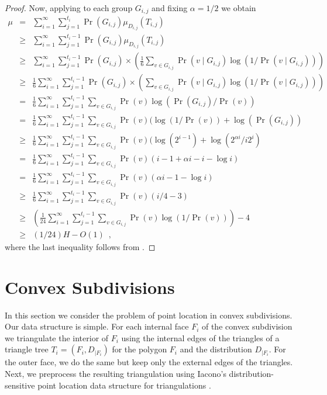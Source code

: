 \documentclass[charterfonts,lotsofwhite]{patmorin}
\begin{document}
\begin{proof}
Now, applying  to each group $G_{i,j}$ and fixing
$\alpha = 1/2$ we obtain
\begin{eqnarray*}
\mu & = & \sum_{i=1}^{\infty}\sum_{j=1}^{t_i}
	\Pr(G_{i,j})\mu_{D_{i,j}}(T_{i,j}) \\
& \ge & \sum_{i=1}^{\infty}\sum_{j=1}^{t_i-1}
	\Pr(G_{i,j})\mu_{D_{i,j}}(T_{i,j}) \\
& \ge & \sum_{i=1}^{\infty}\sum_{j=1}^{t_i-1}\Pr(G_{i,j})\times
	\left(\frac{1}{6}
	\sum_{v\in G_{i,j}}\Pr(v\mid G_{i,j})\log(1/\Pr(v\mid G_{i,j}))
	\right) \\
& \ge & \frac{1}{6}\sum_{i=1}^{\infty}\sum_{j=1}^{t_i-1}\Pr(G_{i,j})\times
	\left(
	\sum_{v\in G_{i,j}}\Pr(v\mid G_{i,j})\log(1/\Pr(v\mid G_{i,j}))
	\right) \\
& = & \frac{1}{6}\sum_{i=1}^{\infty}\sum_{j=1}^{t_i-1}
	\sum_{v\in G_{i,j}}\Pr(v)\log(\Pr(G_{i,j})/\Pr(v)) \\
& = & \frac{1}{6}\sum_{i=1}^{\infty}\sum_{j=1}^{t_i-1}
	\sum_{v\in G_{i,j}}\Pr(v)(\log(1/\Pr(v))+ \log(\Pr(G_{i,j})) \\
& \ge & \frac{1}{6}\sum_{i=1}^{\infty}\sum_{j=1}^{t_i-1}
	\sum_{v\in G_{i,j}}\Pr(v)(\log(2^{i-1}) + \log(2^{\alpha i}/i2^{i}) \\
& = & \frac{1}{6}\sum_{i=1}^{\infty}\sum_{j=1}^{t_i-1}
	\sum_{v\in G_{i,j}}\Pr(v)(i-1 + \alpha i -i -\log i) \\
& = & \frac{1}{6}\sum_{i=1}^{\infty}\sum_{j=1}^{t_i-1}
	\sum_{v\in G_{i,j}}\Pr(v)(\alpha i  -1 -\log i) \\
& \ge & \frac{1}{6}\sum_{i=1}^{\infty}\sum_{j=1}^{t_i-1}
	\sum_{v\in G_{i,j}}\Pr(v)(i/4 - 3) \\
& \ge & \left(\frac{1}{24}\sum_{i=1}^{\infty}\sum_{j=1}^{t_i-1}
	\sum_{v\in G_{i,j}}\Pr(v)\log (1/\Pr(v))\right)-4 \\
& \ge & (1/24)H - O(1)  \enspace ,
\end{eqnarray*}
where the last inequality follows from .
\end{proof}

\section{Convex Subdivisions}

In this section we consider the problem of point location in convex
subdivisions. Our data structure is simple.  For each internal face
$F_i$ of the convex subdivision we triangulate the interior of $F_i$
using the internal edges of the triangles of a triangle tree
$T_i=(F_i,D_{|F_i})$ for the polygon $F_i$ and the distribution
$D_{|F_i}$. For the outer face, we do the same but keep only the
external edges of the triangles.  Next, we preprocess the resulting
triangulation using Iacono's distribution-sensitive point location
data structure for triangulations \cite{i01}.
\end{document}
